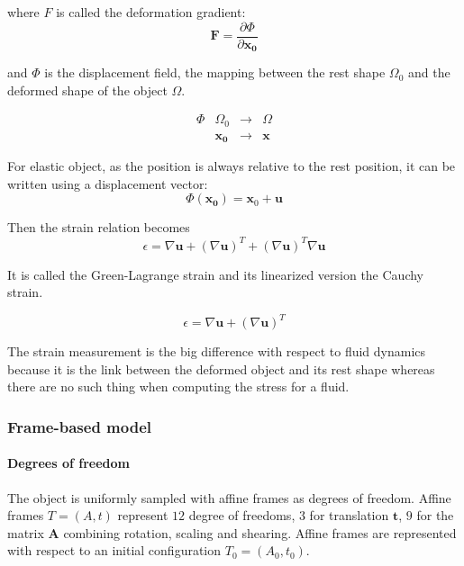 where $F$ is called the deformation gradient:
\begin{equation}
\mathbf{F} = \frac{\partial \Phi}{\partial \mathbf{x_{0}}}
\end{equation}

and $\Phi$ is the displacement field, the mapping between the rest shape $\Omega_{0}$ and the deformed shape of the object $\Omega$. 

\begin{equation}
\begin{array}{llll}
\Phi & \Omega_{0} & \longrightarrow & \Omega \\
	 & \mathbf{x_{0}} & \longrightarrow & \mathbf{x}
\end{array}
\end{equation}

For elastic object, as the position is always relative to the rest position, it can be written using a displacement vector:
\begin{equation}
\Phi(\mathbf{x_{0}}) = \mathbf{x}_{0} + \mathbf{u}
\end{equation}

Then the strain relation becomes
\begin{equation}
\epsilon = \nabla \mathbf{u} + \left( \nabla \mathbf{u} \right)^{T} + \left(\nabla \mathbf{u}\right)^{T}\nabla \mathbf{u}
\end{equation}

It is called the Green-Lagrange strain and its linearized version the Cauchy strain.

\begin{equation}
\epsilon = \nabla \mathbf{u} + \left( \nabla \mathbf{u} \right)^{T}
\end{equation}

The strain measurement is the big difference with respect to fluid dynamics because it is the link between the deformed object and its rest shape whereas there are no such thing when computing the stress for a fluid.

\subsubsection{Frame-based model}

\paragraph{Degrees of freedom}
The object is uniformly sampled with affine frames as degrees of freedom. Affine frames $T=(A,t)$ represent $12$ degree of freedoms, $3$ for translation $\mathbf{t}$, $9$ for the matrix $\mathbf{A}$ combining rotation, scaling and shearing. Affine frames are represented with respect to an initial configuration $T_{0} = \left(A_{0}, t_{0}\right)$.

